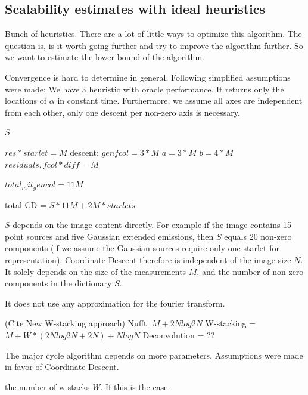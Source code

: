 \subsection{Scalability estimates with ideal heuristics}
Bunch of heuristics. There are a lot of little ways to optimize this algorithm. The question is, is it worth going further and try to improve the algorithm further. So we want to estimate the lower bound of the algorithm.

Convergence is hard to determine in general. Following simplified assumptions were made: We have a heuristic with oracle performance. It returns only the locations of $\alpha$ in constant time. Furthermore, we assume all axes are independent from each other, only one descent per non-zero axis is necessary.

$S$


$res * starlet = M$
descent:
$gen fcol = 3*M$
$a = 3 * M$
$b = 4 * M$
$residuals, fcol*diff =  M$

$total_mit_gencol = 11M$

total CD = $S * 11M + 2M * starlets$

$S$ depends on the image content directly. For example if the image contains 15 point sources and five Gaussian extended emissions, then $S$ equals 20 non-zero components (if we assume the Gaussian sources require only one starlet for representation). Coordinate Descent therefore is independent of the image size $N$. It solely depends on the size of the measurements $M$, and the number of non-zero components in the dictionary $S$. 

It does not use any approximation for the fourier transform.



(Cite New W-stacking approach)
Nufft: $M + 2N log 2N$
W-stacking = $M + W*(2N log 2N + 2N) + N log N$
Deconvolution = ??

The major cycle algorithm depends on more parameters. Assumptions were made in favor of Coordinate Descent.

the number of w-stacks $W$. If this is the case

